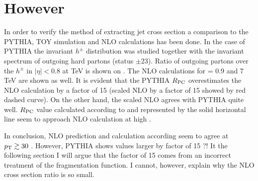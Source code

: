 \documentclass[12pt]{article}
\begin{document}
\section{However}

In order to verify the method of extracting jet cross section a comparison to the PYTHIA, TOY simulation and NLO calculations \cite{Jager:2002xm} has been done.
In the case of PYTHIA the invariant $h^{\pm}$ distribution was studied together with the invariant spectrum of outgoing hard partons (status $\pm$23). Ratio of outgoing partons over the $h^{\pm}$ in $|\eta|<0.8$ at  TeV is shown on . The NLO calculations for \s= 0.9 and 7 TeV are shown as well. It is evident that the PYTHIA $R_{\rm PC}$ overestimates the NLO calculation by a factor of 15 (scaled NLO by a factor of 15 showed by red dashed curve). On the other hand, the scaled NLO agrees with PYTHIA quite well.
$R_{\rm PC}$ value calculated according to  and represented by the solid horizontal line seem to approach NLO calculation at 
high \pt{}.

In conclusion, NLO prediction and calculation according  seem to agree at $p_{\rm T}\gtrsim 30$ \gevc. However, PYTHIA shows values larger by factor of 15 ?! It the following section I will argue that the factor of 15 comes from an incorrect treatment of the fragmentation function. I cannot, however, explain why the NLO cross section ratio is so small.
\end{document}
